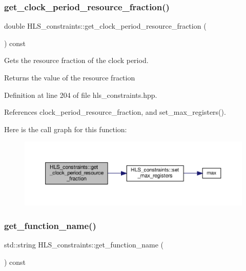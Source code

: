 \subsubsection{\texorpdfstring{get\+\_\+clock\+\_\+period\+\_\+resource\+\_\+fraction()}{get\_clock\_period\_resource\_fraction()}}
{\footnotesize\ttfamily double H\+L\+S\+\_\+constraints\+::get\+\_\+clock\+\_\+period\+\_\+resource\+\_\+fraction (\begin{DoxyParamCaption}{ }\end{DoxyParamCaption}) const\hspace{0.3cm}{\ttfamily [inline]}}



Gets the resource fraction of the clock period. 

\begin{DoxyReturn}{Returns}
the value of the resource fraction 
\end{DoxyReturn}


Definition at line 204 of file hls\+\_\+constraints.\+hpp.



References clock\+\_\+period\+\_\+resource\+\_\+fraction, and set\+\_\+max\+\_\+registers().

Here is the call graph for this function\+:
\nopagebreak
\begin{figure}[H]
\begin{center}
\leavevmode
\includegraphics[width=350pt]{dd/d96/classHLS__constraints_a4daca2ffc0b08c77e83d16b3c45a0cdf_cgraph}
\end{center}
\end{figure}
\mbox{\label{classHLS__constraints_abbffb36768c52ff80a0b8cd24c5ab048}} 
\subsubsection{\texorpdfstring{get\+\_\+function\+\_\+name()}{get\_function\_name()}}
{\footnotesize\ttfamily std\+::string H\+L\+S\+\_\+constraints\+::get\+\_\+function\+\_\+name (\begin{DoxyParamCaption}{ }\end{DoxyParamCaption}) const}



